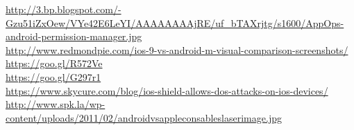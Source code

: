 \begin{frame}
	\scriptsize
	\url{http://3.bp.blogspot.com/-Gzu51iZxOew/VYe42E6LeYI/AAAAAAAAjRE/uf_bTAXrjtg/s1600/AppOps-android-permission-manager.jpg}\\
	\url{http://www.redmondpie.com/ios-9-vs-android-m-visual-comparison-screenshots/}\\
	\url{https://goo.gl/R572Ve}\\
	\url{https://goo.gl/G297r1}\\
	\url{https://www.skycure.com/blog/ios-shield-allows-dos-attacks-on-ios-devices/}\\
	\url{http://www.spk.la/wp-content/uploads/2011/02/androidvsappleconsableslaserimage.jpg}
	
\end{frame}